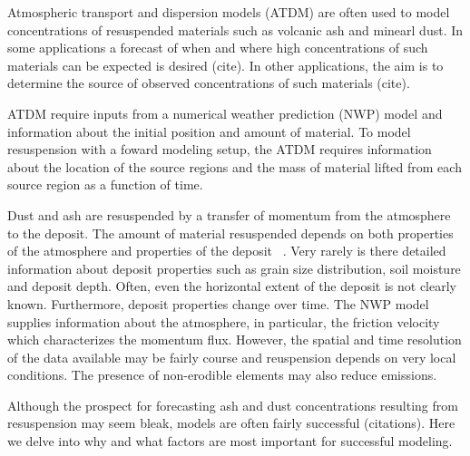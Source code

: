 
\introduction  %

Atmospheric transport and dispersion models (ATDM) are often used to model concentrations
of resuspended materials such as volcanic ash and minearl dust. In some applications a forecast of when and where
high concentrations of such materials can be expected is desired (cite). In other applications, the aim
is to determine the source of observed concentrations of such materials (cite).

ATDM require inputs from a numerical weather prediction (NWP) model and
information about the initial position and amount of material. To model resuspension with a foward modeling setup, the ATDM
requires information about the location of the source regions and the mass of material lifted from each source
region as a function of time. 

Dust and ash are resuspended
by a transfer of momentum from the atmosphere to the deposit. The amount of material resuspended
depends on both properties of the atmosphere and properties of the deposit ~\citep{Kok12}. 
Very rarely is there detailed information about deposit properties such as grain size distribution, soil moisture and deposit depth.
Often, even the horizontal extent of the deposit is not clearly known. 
Furthermore, deposit properties change over time. 
The NWP model supplies information about the atmosphere, in particular, the friction velocity which characterizes
the momentum flux. However, the spatial and time resolution of the data available may be fairly course and
reuspension depends on very local conditions. The presence of non-erodible elements may also reduce emissions.

Although the prospect for forecasting ash and dust concentrations resulting from resuspension may seem bleak, models are often
fairly successful (citations). Here we delve into why and what factors are most important for successful modeling.


